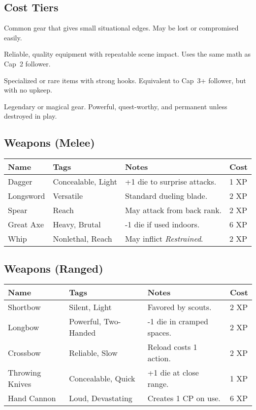 \documentclass[12pt]{book}
\begin{document}
\subsection{Cost Tiers}
\begin{description}[leftmargin=2cm]
  \item[Basic (1 XP)] Common gear that gives small situational edges. May be lost or compromised easily.
  \item[Standard (2 XP)] Reliable, quality equipment with repeatable scene impact. Uses the same math as Cap~2 follower.
  \item[Superior (6 XP)] Specialized or rare items with strong hooks. Equivalent to Cap~3+ follower, but with no upkeep.
  \item[Artifact (12 XP or GM Award)] Legendary or magical gear. Powerful, quest-worthy, and permanent unless destroyed in play.
\end{description}

\subsection*{Weapons (Melee)}
\begin{tabular}{@{}llll@{}}
\toprule
\textbf{Name} & \textbf{Tags} & \textbf{Notes} & \textbf{Cost} \\
\midrule
Dagger & Concealable, Light & +1 die to surprise attacks. & 1 XP \\
Longsword & Versatile & Standard dueling blade. & 2 XP \\
Spear & Reach & May attack from back rank. & 2 XP \\
Great Axe & Heavy, Brutal & -1 die if used indoors. & 6 XP \\
Whip & Nonlethal, Reach & May inflict \emph{Restrained}. & 2 XP \\
\bottomrule
\end{tabular}

\subsection*{Weapons (Ranged)}
\begin{tabular}{@{}llll@{}}
\toprule
\textbf{Name} & \textbf{Tags} & \textbf{Notes} & \textbf{Cost} \\
\midrule
Shortbow & Silent, Light & Favored by scouts. & 2 XP \\
Longbow & Powerful, Two-Handed & -1 die in cramped spaces. & 2 XP \\
Crossbow & Reliable, Slow & Reload costs 1 action. & 2 XP \\
Throwing Knives & Concealable, Quick & +1 die at close range. & 1 XP \\
Hand Cannon & Loud, Devastating & Creates 1 CP on use. & 6 XP \\
\bottomrule
\end{tabular}
\end{document}
